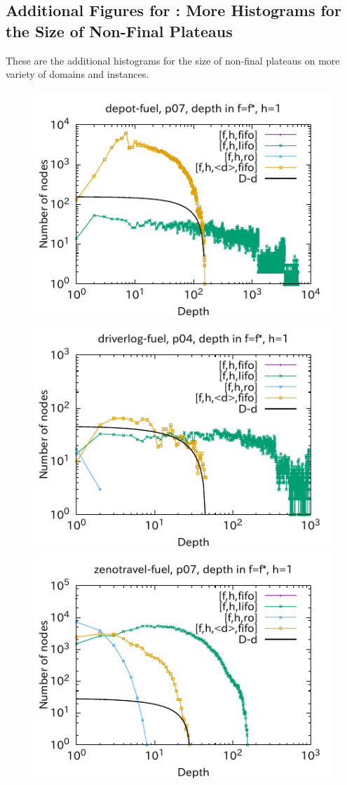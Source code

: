 \clearpage
\subsection{Additional Figures for : More Histograms for the Size of Non-Final Plateaus}

These are the additional histograms for the size of non-final plateaus on
more variety of domains and instances.

\begin{figure}[htbp]
\includegraphics{img/output-lmcut/depot-fuel/p07-1.pdf}
\includegraphics{img/output-lmcut/driverlog-fuel/p04-1.pdf}
\includegraphics{img/output-lmcut/zenotravel-fuel/p07-1.pdf}

\end{figure}
